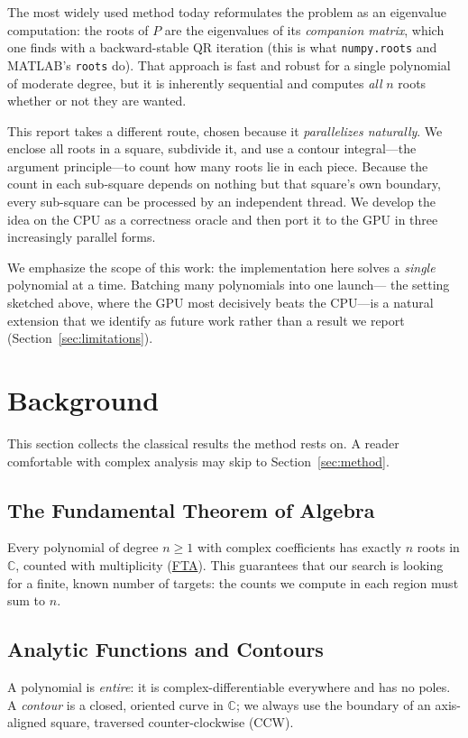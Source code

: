 \documentclass[11pt]{article}
\newcommand{\C}{\mathbb{C}}
\begin{document}
The most widely used method today reformulates the problem as an eigenvalue
computation: the roots of $P$ are the eigenvalues of its \emph{companion matrix},
which one finds with a backward-stable QR iteration (this is what
\texttt{numpy.roots} and MATLAB's \texttt{roots} do). That approach is fast and
robust for a single polynomial of moderate degree, but it is inherently
sequential and computes \emph{all} $n$ roots whether or not they are wanted.

This report takes a different route, chosen because it \emph{parallelizes
naturally}. We enclose all roots in a square, subdivide it, and use a contour
integral---the argument principle---to count how many roots lie in each piece.
Because the count in each sub-square depends on nothing but that square's own
boundary, every sub-square can be processed by an independent thread. We develop
the idea on the CPU as a correctness oracle and then port it to the GPU in three
increasingly parallel forms.

We emphasize the scope of this work: the implementation here solves a
\emph{single} polynomial at a time. Batching many polynomials into one launch---
the setting sketched above, where the GPU most decisively beats the CPU---is a
natural extension that we identify as future work rather than a result we report
(Section~\ref{sec:limitations}).

\section{Background}
This section collects the classical results the method rests on. A reader
comfortable with complex analysis may skip to Section~\ref{sec:method}.

\subsection{The Fundamental Theorem of Algebra}
Every polynomial of degree $n \ge 1$ with complex coefficients has exactly $n$
roots in $\C$, counted with multiplicity
(\href{https://en.wikipedia.org/wiki/Fundamental_theorem_of_algebra}{FTA}). This
guarantees that our search is looking for a finite, known number of targets: the
counts we compute in each region must sum to $n$.

\subsection{Analytic Functions and Contours}
A polynomial is \emph{entire}: it is complex-differentiable everywhere and has no
poles. A \emph{contour} is a closed, oriented curve in $\C$; we always use the
boundary of an axis-aligned square, traversed counter-clockwise (CCW).
\end{document}
